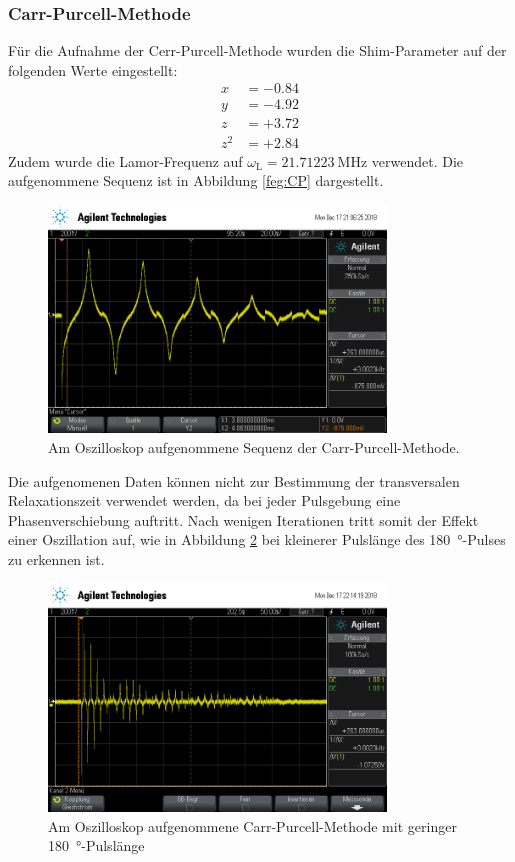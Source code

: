 \subsubsection{Carr-Purcell-Methode}
Für die Aufnahme der Cerr-Purcell-Methode wurden die Shim-Parameter auf der
folgenden Werte eingestellt:
\begin{align*}
  x &= -\num{0.84} \\
  y &= -\num{4.92} \\
  z &= +\num{3.72} \\
  z^2 &= +\num{2.84}
\end{align*}
Zudem wurde die Lamor-Frequenz auf $\omega_\text{L} = \SI{21.71223}{\mega\hertz}$
verwendet. Die aufgenommene Sequenz ist in Abbildung \ref{feg:CP} dargestellt.
\begin{figure}[htb]
  \centering
  \includegraphics[width=0.8\textwidth]{rohdaten/cp_2.png}
  \caption{Am Oszilloskop aufgenommene Sequenz der Carr-Purcell-Methode.}
  \label{fig:CP}
\end{figure}
Die aufgenomenen Daten können nicht zur Bestimmung der transversalen
Relaxationszeit verwendet werden, da bei jeder Pulsgebung eine Phasenverschiebung
auftritt. Nach wenigen Iterationen tritt somit der Effekt einer Oszillation auf,
wie in Abbildung \ref{fig:CP2} bei kleinerer Pulslänge des \SI{180}{\degree}-Pulses
zu erkennen ist.
\begin{figure}[htb]
  \centering
  \includegraphics[width=0.8\textwidth]{rohdaten/cp_3.png}
  \caption{Am Oszilloskop aufgenommene Carr-Purcell-Methode mit geringer
  \SI{180}{\degree}-Pulslänge}
  \label{fig:CP2}
\end{figure}
\FloatBarrier


